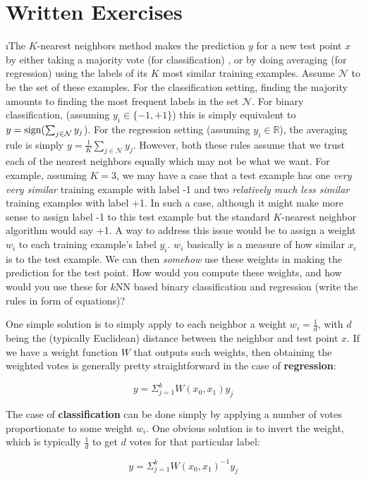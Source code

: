 \documentclass[fleqn]{article}
\begin{document}


\section{Written Exercises}

\bee

\i The $K$-nearest neighbors method makes the prediction $y$ for a new
test point $x$ by either taking a majority vote (for classification) 
, or by doing averaging (for regression) using the labels of its
$K$ most similar training examples. Assume $\mathcal{N}$  to be the 
set of these examples. For the classification setting, finding the majority 
amounts to finding the most frequent labels in the set $\mathcal{N}$. For 
binary classification, (assuming $y_i \in \{-1,+1\}$) this is simply 
equivalent to $y = \textrm{sign}(\sum_{j \in \mathcal{N}} y_j$). For the regression 
setting (assuming $y_i \in \mathbb{R}$), the averaging rule is simply 
$y = \frac{1}{K}\sum_{j \in \mathcal{N}} y_j$.  However, both these rules 
assume that we trust each of the nearest neighbors equally which may not be 
what we want. For example, assuming $K = 3$, we may have a case that a test 
example has one \textit{very very similar} training example with label -1 
and two \textit{relatively much less similar} training examples with label +1. 
In such a case, although it might make more sense to assign label -1 to 
this test example but the standard $K$-nearest neighbor algorithm would say +1.
A way to address this issue would be to assign a weight $w_i$ to each 
training example's label $y_i$. $w_i$ basically is a measure of how similar
$x_i$ is to the test example. We can then \textit{somehow} use these weights 
in making the prediction for the test point. How would you compute these weights, 
and how would you use these for $k$NN based binary classification and regression 
(write the rules in form of equations)?

\begin{solution}
One simple solution is to simply apply to each neighbor a weight $w_i = \frac{1}{d}$, with $d$ being the (typically Euclidean) distance between the neighbor and test point $x$. If we have a weight function $W$ that outputs such weights, then obtaining the weighted votes is generally pretty straightforward in the case of \textbf{regression}:

\begin{equation}
y = \Sigma_{j = 1}^k W(x_0, x_1) y_j
\end{equation}

The case of \textbf{classification} can be done simply by applying a number of votes proportionate to some weight $w_i$. One obvious solution is to invert the weight, which is typically $\frac{1}{d}$ to get $d$ votes for that particular label:

\begin{equation}
y = \Sigma_{j = 1}^k W(x_0, x_1)^{-1} y_j
\end{equation}

\end{solution}
\end{document}
